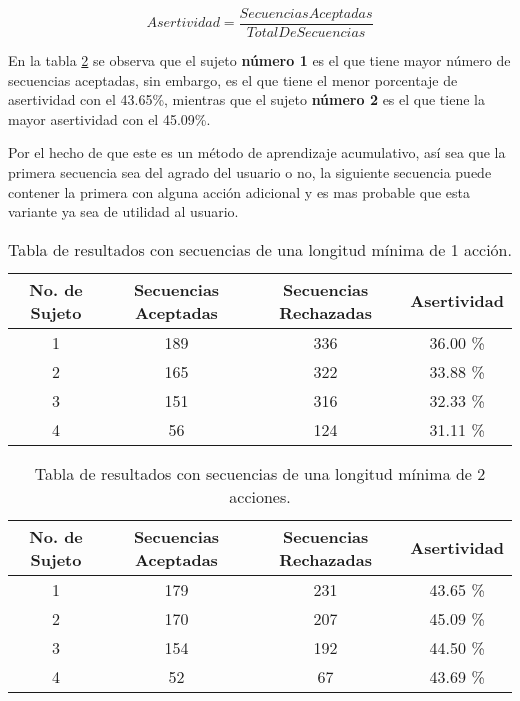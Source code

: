\begin{equation}
Asertividad = \dfrac{ Secuencias Aceptadas}{Total De Secuencias}
\label{eqAsertividad}
\end{equation}
 
En la tabla \ref{tableRes2} se observa que el sujeto \textbf{n\'umero 1} es el 
 que tiene mayor n\'umero de secuencias aceptadas, sin embargo, es el que tiene 
 el menor porcentaje de asertividad con el 43.65\%, mientras que el sujeto 
 \textbf{n\'umero 2} es el que tiene la mayor asertividad con el 45.09\%.


Por el hecho de que este es un m\'etodo de aprendizaje acumulativo, as\'i sea
 que la primera secuencia sea del agrado del usuario o no, la siguiente 
 secuencia puede contener la primera con alguna acci\'on adicional y es mas 
 probable que esta variante ya sea de utilidad al usuario. 


\begin{table}[]
\centering
\begin{tabular}{cccc}
\hline
No. de Sujeto	
&	Secuencias Aceptadas	
&   Secuencias Rechazadas	
&	Asertividad		\\ \hline

1				
&	189						
&	336						
&	36.00 \%		\\

2				
&	165						
&	322						
&	33.88 \%		\\

3
&	151
&	316
&	32.33 \%		\\

4
&	56
&	124
&	31.11 \%		\\
\hline
\end{tabular}
\caption{Tabla de resultados con secuencias de una longitud m\'inima de 
 1 acci\'on.}
\label{tableRes1}
\end{table}



\begin{table}[]
\centering
\begin{tabular}{cccc}
\hline
No. de Sujeto
&	Secuencias Aceptadas
&   Secuencias Rechazadas
&	Asertividad		\\ \hline

1
&	179
&	231
&	43.65 \%		\\
	
2
&	170
&	207
&	45.09 \%		\\

3
&	154
&	192
&	44.50 \%		\\

4
&	52
&	67
&	43.69 \%		\\
\hline
\end{tabular}
\caption{Tabla de resultados con secuencias de una longitud m\'inima de 
 2 acciones.}
\label{tableRes2}
\end{table}


